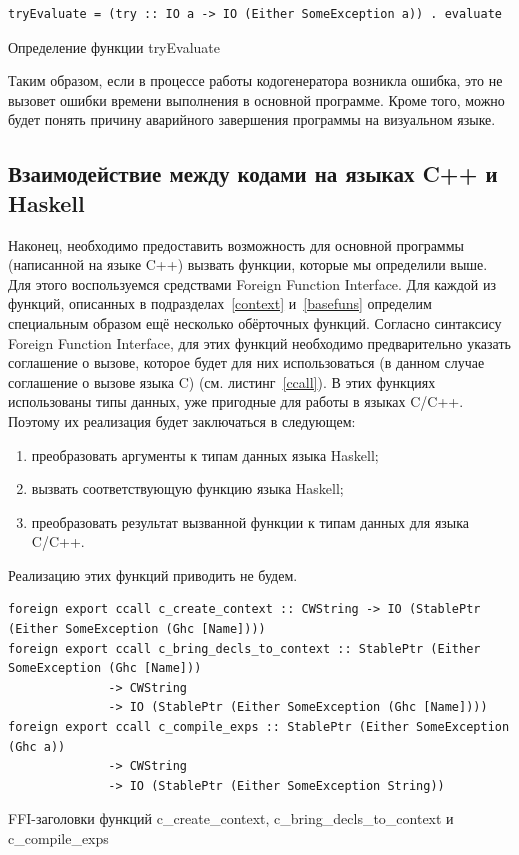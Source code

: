 \begin{ListingEnv}[h]
	\begin{lstlisting}
tryEvaluate = (try :: IO a -> IO (Either SomeException a)) . evaluate
	\end{lstlisting}
	\caption{Определение функции tryEvaluate}\label{tryeval}
\end{ListingEnv}
	
	Таким образом, если в процессе работы кодогенератора возникла ошибка, это не вызовет ошибки времени выполнения в основной программе. Кроме того, можно будет понять причину аварийного завершения программы на визуальном языке.
	
	\subsection{Взаимодействие между кодами на языках C++ и Haskell}	
	Наконец, необходимо предоставить возможность для основной программы (написанной на языке C++) вызвать функции, которые мы определили выше. Для этого воспользуемся средствами Foreign Function Interface. Для каждой из функций, описанных в подразделах~\ref{context} и~\ref{basefuns} определим специальным образом ещё несколько обёрточных функций. Согласно синтаксису Foreign Function Interface, для этих функций необходимо предварительно указать соглашение о вызове, которое будет для них использоваться (в данном случае соглашение о вызове языка C) (см. листинг~\ref{ccall}). В этих функциях использованы типы данных, уже пригодные для работы в языках C/C++. Поэтому их реализация будет заключаться в следующем:
	\begin{enumerate}[1)]
		\item преобразовать аргументы к типам данных языка Haskell;
		\item вызвать соответствующую функцию языка Haskell;
		\item преобразовать результат вызванной функции к типам данных для языка C/C++.
	\end{enumerate}

	Реализацию этих функций приводить не будем.

\begin{ListingEnv}
	\begin{lstlisting}
foreign export ccall c_create_context :: CWString -> IO (StablePtr (Either SomeException (Ghc [Name])))
foreign export ccall c_bring_decls_to_context :: StablePtr (Either SomeException (Ghc [Name])) 
              -> CWString 
              -> IO (StablePtr (Either SomeException (Ghc [Name])))
foreign export ccall c_compile_exps :: StablePtr (Either SomeException (Ghc a)) 
              -> CWString 
              -> IO (StablePtr (Either SomeException String))
	\end{lstlisting}
	\caption{FFI-заголовки функций c\_create\_context, c\_bring\_decls\_to\_context и c\_compile\_exps}\label{ccall}
\end{ListingEnv}	
	
